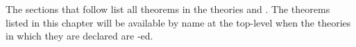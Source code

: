 \label{theorems}

The sections that follow list all theorems in the theories
 and .  The theorems listed in this
chapter will be available by name at the top-level when the theories
in which they are declared are -ed.
